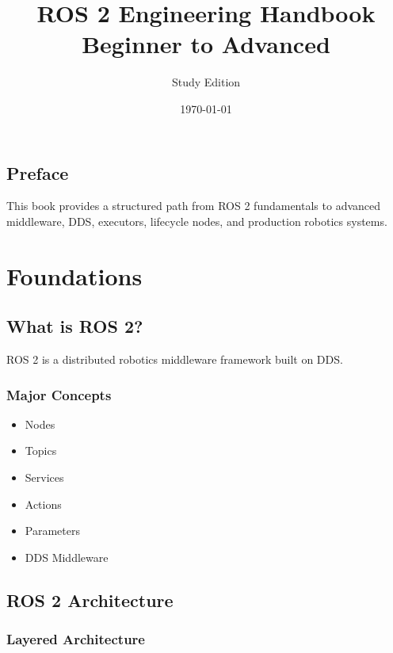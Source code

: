 \documentclass[11pt,oneside]{book}
\title{ROS 2 Engineering Handbook \\ Beginner to Advanced}
\author{Study Edition}
\date{\today}
\begin{document}
\frontmatter
\maketitle
\tableofcontents

\chapter*{Preface}
This book provides a structured path from ROS 2 fundamentals to advanced
middleware, DDS, executors, lifecycle nodes, and production robotics systems.

\mainmatter

\part{Foundations}

\chapter{What is ROS 2?}

ROS 2 is a distributed robotics middleware framework built on DDS.

\section{Major Concepts}
\begin{itemize}
\item Nodes
\item Topics
\item Services
\item Actions
\item Parameters
\item DDS Middleware
\end{itemize}

\chapter{ROS 2 Architecture}

\section{Layered Architecture}

\begin{center}
\end{center}
\end{document}
